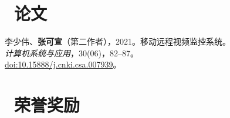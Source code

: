 \documentclass{resume}
\begin{document}
\section{\faBook\ 论文}
李少伟、\textbf{张可宣}（第二作者），2021。移动远程视频监控系统。\\
\textit{计算机系统与应用}，30(06)，82--87。\\
\href{https://doi.org/10.15888/j.cnki.csa.007939}{doi:10.15888/j.cnki.csa.007939}。

\section{\faHeartO\ 荣誉奖励}
\end{document}
